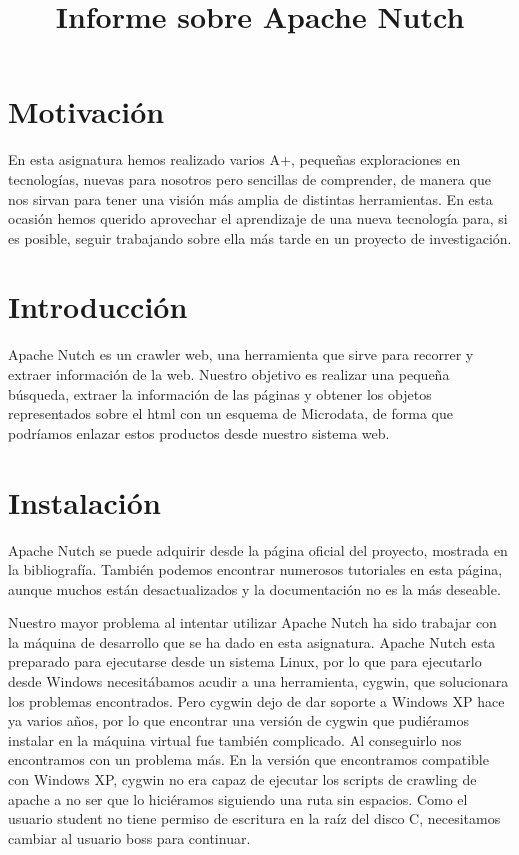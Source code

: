 \documentclass[a4paper]{article}
\title{Informe sobre Apache Nutch}
\date{}
\begin{document}
\setlength{\voffset}{-1in}
\setlength{\textheight}{680px}
\setlength{\headsep}{30px}
\maketitle

\section{Motivación}

En esta asignatura hemos realizado varios A+, pequeñas exploraciones en tecnologías, nuevas para nosotros pero sencillas de comprender, de manera que nos sirvan para tener una visión más amplia de distintas herramientas. En esta ocasión hemos querido aprovechar el aprendizaje de una nueva tecnología para, si es posible, seguir trabajando sobre ella más tarde en un proyecto de investigación. 

\section{Introducción}

Apache Nutch es un crawler web, una herramienta que sirve para recorrer y extraer información de la web. Nuestro objetivo es realizar una pequeña búsqueda, extraer la información de las páginas y obtener los objetos representados sobre el html con un esquema de Microdata, de forma que podríamos enlazar estos productos desde nuestro sistema web.

\section{Instalación}

Apache Nutch se puede adquirir desde la página oficial del proyecto, mostrada en la bibliografía. También podemos encontrar numerosos tutoriales en esta página, aunque muchos están desactualizados y la documentación no es la más deseable.

Nuestro mayor problema al intentar utilizar Apache Nutch ha sido trabajar con la máquina de desarrollo que se ha dado en esta asignatura. Apache Nutch esta preparado para ejecutarse desde un sistema Linux, por lo que para ejecutarlo desde Windows necesitábamos acudir a una herramienta, cygwin, que solucionara los problemas encontrados. Pero cygwin dejo de dar soporte a Windows XP hace ya varios años, por lo que encontrar una versión de cygwin que pudiéramos instalar en la máquina virtual fue también complicado. Al conseguirlo nos encontramos con un problema más. En la versión que encontramos compatible con Windows XP, cygwin no era capaz de ejecutar los scripts de crawling de apache a no ser que lo hiciéramos siguiendo una ruta sin espacios. Como el usuario student no tiene permiso de escritura en la raíz del disco C, necesitamos cambiar al usuario boss para continuar.
\end{document}
